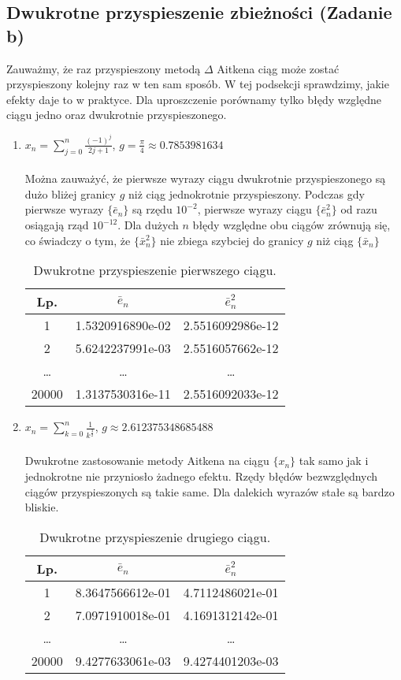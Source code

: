 \documentclass{article}
\begin{document}
\subsection{Dwukrotne przyspieszenie zbieżności (Zadanie b)}
Zauważmy, że raz przyspieszony metodą $\Delta$ Aitkena ciąg może zostać przyspieszony kolejny raz w ten sam sposób. 
W tej podsekcji sprawdzimy, jakie efekty daje to w praktyce. Dla uproszczenie porównamy tylko błędy względne ciągu jedno oraz dwukrotnie przyspieszonego.

\begin{enumerate}

\item $x_n = \sum\limits_{j=0}^n \frac{(-1)^j}{2j + 1}$, $g = \frac{\pi}{4} \approx 0.7853981634$ \\ \\
Można zauważyć, że pierwsze wyrazy ciągu dwukrotnie przyspieszonego są dużo bliżej granicy $g$ niż ciąg jednokrotnie przyspieszony. Podczas gdy pierwsze wyrazy $\{\bar{e}_n\}$ są rzędu $10^{-2}$, pierwsze wyrazy ciągu $\{\bar{e}_n^2\}$ od razu osiągają rząd $10^{-12}$. Dla dużych $n$ błędy względne obu ciągów zrównują się, co świadczy o tym, że $\{\bar{x}_n^2\}$ nie zbiega szybciej do granicy $g$ niż ciąg $\{\bar{x}_n\}$
\begin{table}[h]
\centering
\begin{tabular}[c]{|c|c|c|}
\hline
\textbf{Lp.} & $\bar{e}_n$ & $\bar{e}_n^2$ \\
\hline
1 & 
1.5320916890e-02 &
2.5516092986e-12 \\
\hline
2 &
5.6242237991e-03 &
2.5516057662e-12 \\
\hline
\dots & \ldots & \ldots \\
\hline
20000 &
1.3137530316e-11 &
2.5516092033e-12 \\
\hline
\end{tabular}
\caption{Dwukrotne przyspieszenie pierwszego ciągu.}
\end{table}

\item $x_n = \sum\limits_{k=0}^n \frac{1}{k^\frac{3}{2}}$, $g \approx 2.612375348685488$ \\ \\
Dwukrotne zastosowanie metody Aitkena na ciągu $\{x_n\}$ tak samo jak i jednokrotne nie przyniosło żadnego efektu. Rzędy błędów bezwzględnych ciągów przyspieszonych są takie same. Dla dalekich wyrazów stałe są bardzo bliskie.
\begin{table}[h]
\centering
\begin{tabular}[c]{|c|c|c|}
\hline
\textbf{Lp.} & $\bar{e}_n$ & $\bar{e}_n^2$ \\
\hline
1 & 
8.3647566612e-01 &
4.7112486021e-01 \\
\hline
2 &
7.0971910018e-01 &
4.1691312142e-01 \\
\hline
\dots & \ldots & \ldots \\
\hline
20000 &
9.4277633061e-03 &
9.4274401203e-03 \\
\hline
\end{tabular}
\caption{Dwukrotne przyspieszenie drugiego ciągu.}
\end{table}


\end{enumerate}
\end{document}
